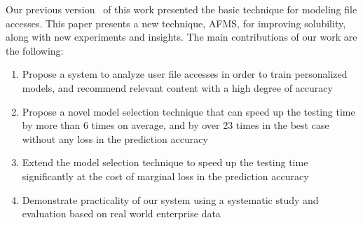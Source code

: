 Our previous version~\cite{dwiticeis15} of this work presented the
basic technique for modeling file accesses.  This paper presents a
new technique, AFMS, for improving solubility, along with new
experiments and insights.  The main contributions of our work are the
following:
\begin{enumerate}
\item Propose a system to analyze user file accesses in order to train
  personalized models, and recommend relevant content with a high
  degree of accuracy
\item Propose a novel model selection technique that can speed up the
  testing time by more than 6 times on average, and by over 23 times in the best case
  without any loss in the prediction accuracy
\item Extend the model selection technique to speed up the testing time
  significantly at the cost of marginal loss in the prediction accuracy
\item Demonstrate practicality of our system using a systematic study
  and evaluation based on real world enterprise data
\end{enumerate}

%
%
%
%
%


